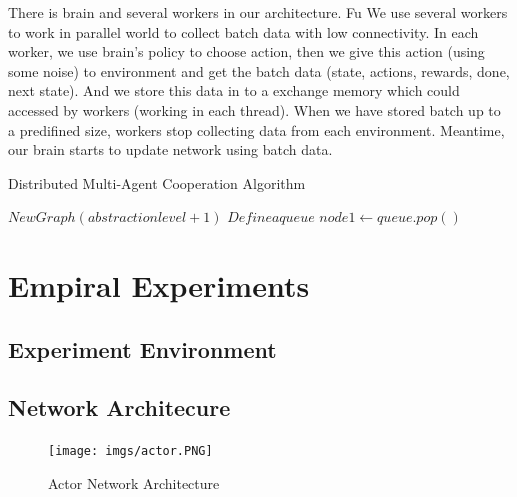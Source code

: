 \documentclass[11pt,twocolumn]{jarticle} %
\begin{document}
There is brain and several workers in our architecture. Fu We use several workers to work in parallel world to collect batch data with low connectivity. In each worker,  we use brain's policy to choose action, then we give this action (using some noise) to environment and get the batch data (state, actions, rewards, done, next state). And we store this data in to a exchange memory which could accessed by workers (working in each thread). When we have stored batch up to a predifined size, workers stop collecting data from each environment. Meantime, our brain starts to update network using batch data.

\begin{algorithm*}
\caption{Distributed Multi-Agent Cooperation Algorithm}
\begin{algorithmic}
\State {}
\State $New Graph (abstraction level+1)$
\State $Define a queue$
\EndFor
{}
    \State $node1 \gets queue.pop()$
    \EndIf
\EndWhile
{}
\end{algorithmic}
\end{algorithm*}

\section{Empiral Experiments}
\subsection{Experiment Environment}

\subsection{Network Architecure}
\begin{figure}[h]
 \begin{center}
  \texttt{[image: imgs/actor.PNG]}
  \caption{Actor Network Architecture}\label{fig:Actor}
 \end{center}
\end{figure}
\end{document}
